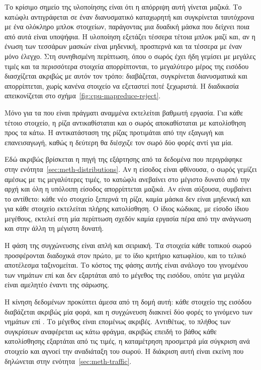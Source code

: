 Το κρίσιμο σημείο της υλοποίησης είναι ότι η απόρριψη αυτή γίνεται μαζικά. Το
κατώφλι αντιγράφεται σε έναν διανυσματικό καταχωρητή και συγκρίνεται ταυτόχρονα
με ένα ολόκληρο μπλοκ στοιχείων, παράγοντας μια δυαδική μάσκα που δείχνει ποια
από αυτά είναι υποψήφια. Η υλοποίηση εξετάζει τέσσερα τέτοια μπλοκ μαζί και,
αν η ένωση των τεσσάρων μασκών είναι μηδενική, προσπερνά και τα τέσσερα με έναν
μόνο έλεγχο. Στη συνηθισμένη περίπτωση, όπου ο σωρός έχει ήδη γεμίσει με μεγάλες
τιμές και τα περισσότερα στοιχεία απορρίπτονται, το μεγαλύτερο μέρος της εισόδου
διασχίζεται ακριβώς με αυτόν τον τρόπο: διαβάζεται, συγκρίνεται διανυσματικά και
απορρίπτεται, χωρίς κανένα στοιχείο να εξεταστεί ποτέ ξεχωριστά. Η διαδικασία
απεικονίζεται στο σχήμα~\ref{fig:cpu-mapreduce-reject}.



Μόνο για τα  που είναι πράγματι αναμμένα εκτελείται βαθμωτή εργασία.
Για κάθε τέτοιο στοιχείο, η ρίζα αντικαθίσταται και ο σωρός αποκαθίσταται με
κατολίσθηση προς τα κάτω. Η αντικατάσταση της ρίζας προτιμάται από την εξαγωγή
και επανεισαγωγή, καθώς η δεύτερη θα διέσχιζε τον σωρό δύο φορές αντί για μία.

Εδώ ακριβώς βρίσκεται η πηγή της εξάρτησης από τα δεδομένα που περιγράφηκε στην
ενότητα~\ref{sec:meth-distributions}. Αν η είσοδος είναι φθίνουσα, ο σωρός
γεμίζει αμέσως με τις μεγαλύτερες τιμές, το κατώφλι ανεβαίνει στο μέγιστο δυνατό
από την αρχή και όλη η υπόλοιπη είσοδος απορρίπτεται μαζικά. Αν είναι αύξουσα,
συμβαίνει το αντίθετο: κάθε νέο στοιχείο ξεπερνά τη ρίζα, καμία μάσκα δεν είναι
μηδενική και για κάθε στοιχείο εκτελείται πλήρης κατολίσθηση. Ο ίδιος κώδικας,
με είσοδο ίδιου μεγέθους, εκτελεί στη μία περίπτωση σχεδόν καμία εργασία πέρα
από την ανάγνωση και στην άλλη τη μέγιστη δυνατή.

Η φάση της συγχώνευσης είναι απλή και σειριακή. Τα στοιχεία κάθε τοπικού σωρού
προσφέρονται διαδοχικά στον πρώτο, με το ίδιο κριτήριο κατωφλίου, και το τελικό
αποτέλεσμα ταξινομείται. Το κόστος της φάσης αυτής είναι ανάλογο του γινομένου
των νημάτων επί  και δεν εξαρτάται από το μέγεθος της εισόδου, οπότε για
μεγάλα  είναι αμελητέο έναντι της σάρωσης.

Η κίνηση δεδομένων προκύπτει άμεσα από τη δομή αυτή: κάθε στοιχείο της εισόδου
διαβάζεται ακριβώς μία φορά, και η συγχώνευση διακινεί δύο φορές το γινόμενο των
νημάτων επί . Το μέγεθος είναι επομένως ακριβές. Αντιθέτως, το πλήθος των
συγκρίσεων αναφέρεται ως κάτω φράγμα, ακριβώς επειδή το βάθος κάθε κατολίσθησης
εξαρτάται από τις τιμές, η καταμέτρηση προσμετρά μία σύγκριση ανά στοιχείο και
αγνοεί την αναδιάταξη του σωρού. Η διάκριση αυτή είναι εκείνη που δηλώνεται στην
ενότητα~\ref{sec:meth-traffic}.

